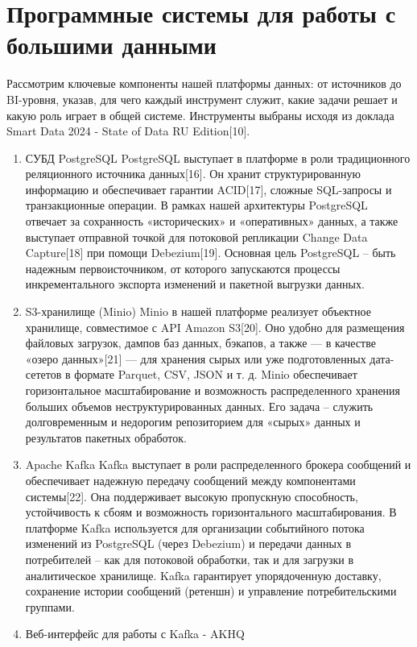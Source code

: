 \section{Программные системы для работы с большими данными} \label{ch2:system_description}
Рассмотрим ключевые компоненты нашей платформы данных: от источников до BI-уровня, указав, для чего каждый инструмент служит, какие задачи решает и какую роль играет в общей системе. Инструменты выбраны исходя из доклада Smart Data 2024 - State of Data RU Edition[10].
\begin{enumerate}[1.]
	\item СУБД PostgreSQL
	      PostgreSQL выступает в платформе в роли традиционного реляционного источника данных[16]. Он хранит структурированную информацию и обеспечивает гарантии ACID[17], сложные SQL-запросы и транзакционные операции. В рамках нашей архитектуры PostgreSQL отвечает за сохранность «исторических» и «оперативных» данных, а также выступает отправной точкой для потоковой репликации Change Data Capture[18] при помощи Debezium[19]. Основная цель PostgreSQL – быть надежным первоисточником, от которого запускаются процессы инкрементального экспорта изменений и пакетной выгрузки данных.
	\item S3-хранилище (Minio)
	      Minio в нашей платформе реализует объектное хранилище, совместимое с API Amazon S3[20]. Оно удобно для размещения файловых загрузок, дампов баз данных, бэкапов, а также — в качестве «озеро данных»[21] — для хранения сырых или уже подготовленных дата-сететов в формате Parquet, CSV, JSON и т. д. Minio обеспечивает горизонтальное масштабирование и возможность распределенного хранения больших объемов неструктурированных данных. Его задача – служить долговременным и недорогим репозиторием для «сырых» данных и результатов пакетных обработок.
	\item Apache Kafka
	      Kafka выступает в роли распределенного брокера сообщений и обеспечивает надежную передачу сообщений между компонентами системы[22]. Она поддерживает высокую пропускную способность, устойчивость к сбоям и возможность горизонтального масштабирования. В платформе Kafka используется для организации событийного потока изменений из PostgreSQL (через Debezium) и передачи данных в потребителей – как для потоковой обработки, так и для загрузки в аналитическое хранилище. Kafka гарантирует упорядоченную доставку, сохранение истории сообщений (ретеншн) и управление потребительскими группами.
	\item Веб-интерфейс для работы с Kafka - AKHQ

\end{enumerate}
